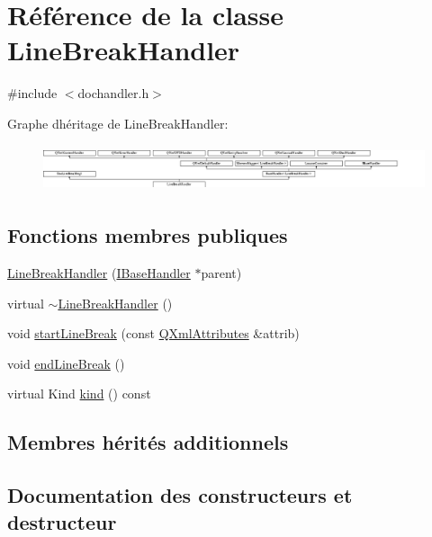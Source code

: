 \hypertarget{class_line_break_handler}{}\section{Référence de la classe Line\+Break\+Handler}
\label{class_line_break_handler}


{\ttfamily \#include $<$dochandler.\+h$>$}

Graphe d\textquotesingle{}héritage de Line\+Break\+Handler\+:\begin{figure}[H]
\begin{center}
\leavevmode
\includegraphics[height=1.367521cm]{class_line_break_handler}
\end{center}
\end{figure}
\subsection*{Fonctions membres publiques}
\begin{DoxyCompactItemize}
\item 
\hyperlink{class_line_break_handler_a14fb5efb1d2f5dabc4f3ee4c74bb6fca}{Line\+Break\+Handler} (\hyperlink{class_i_base_handler}{I\+Base\+Handler} $\ast$parent)
\item 
virtual \hyperlink{class_line_break_handler_adf378c38b958a4f601765600281e24b5}{$\sim$\+Line\+Break\+Handler} ()
\item 
void \hyperlink{class_line_break_handler_a7bda9a1bbf01582552fb573ff9b1a3d6}{start\+Line\+Break} (const \hyperlink{class_q_xml_attributes}{Q\+Xml\+Attributes} \&attrib)
\item 
void \hyperlink{class_line_break_handler_a639205c91a39d76975ab28a533b3836e}{end\+Line\+Break} ()
\item 
virtual Kind \hyperlink{class_line_break_handler_a3be07cbe3b243edeb41811a28acc9cc1}{kind} () const 
\end{DoxyCompactItemize}
\subsection*{Membres hérités additionnels}


\subsection{Documentation des constructeurs et destructeur}
\hypertarget{class_line_break_handler_a14fb5efb1d2f5dabc4f3ee4c74bb6fca}{}
